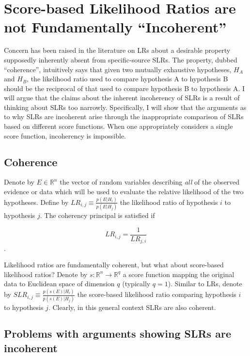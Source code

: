 \documentclass[]{book}
\begin{document}
\hypertarget{score-based-likelihood-ratios-are-not-fundamentally-incoherent}{%
\section{Score-based Likelihood Ratios are not Fundamentally ``Incoherent''}\label{score-based-likelihood-ratios-are-not-fundamentally-incoherent}}

Concern has been raised in the literature on LRs about a desirable property supposedly inherently absent from specific-source SLRs. The property, dubbed ``coherence'', intuitively says that given two mutually exhaustive hypotheses, \(H_A\) and \(H_B\), the likelihood ratio used to compare hypothesis A to hypothesis B should be the reciprocal of that used to compare hypothesis B to hypothesis A. I will argue that the claims about the inherent incoherency of SLRs is a result of thinking about SLRs too narrowly. Specifically, I will show that the arguments as to why SLRs are incoherent arise through the inappropriate comparison of SLRs based on different score functions. When one appropriately considers a single score function, incoherency is impossible.

\hypertarget{coherence}{%
\subsection{Coherence}\label{coherence}}

Denote by \(E \in \mathbb{R}^{n}\) the vector of random variables describing \emph{all} of the observed evidence or data which will be used to evaluate the relative likelihood of the two hypotheses. Define by \(LR_{i,j} \equiv \frac{p(E|H_i)}{p(E|H_j)}\) the likelihood ratio of hypothesis \(i\) to hypothesis \(j\). The coherency principal is satisfied if

\[ LR_{i,j} = \frac{1}{LR_{j,i}} \].

Likelihood ratios are fundamentally coherent, but what about score-based likelihood ratios? Denote by \(s: \mathbb{R}^n \rightarrow \mathbb{R}^{q}\) a score function mapping the original data to Euclidean space of dimension \(q\) (typically \(q = 1\)). Similar to LRs, denote by \(SLR_{i,j} \equiv \frac{p(s(E)|H_i)}{p(s(E)|H_j)}\) the score-based likelihood ratio comparing hypothesis \(i\) to hypothesis \(j\). Clearly, in this general context SLRs are also coherent.

\hypertarget{problems-with-arguments-showing-slrs-are-incoherent}{%
\subsection{Problems with arguments showing SLRs are incoherent}\label{problems-with-arguments-showing-slrs-are-incoherent}}
\end{document}
